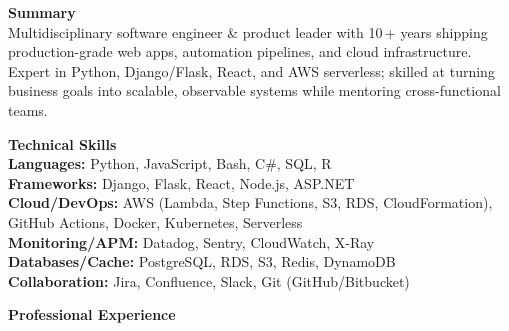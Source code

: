 \documentclass[10pt]{article}
\begin{document}
\RaggedRight

\noindent\textbf{\large Summary}\\
Multidisciplinary software engineer \& product leader with 10\,+ years shipping production-grade web apps, automation pipelines, and cloud infrastructure. Expert in Python, Django/Flask, React, and AWS serverless; skilled at turning business goals into scalable, observable systems while mentoring cross-functional teams.

{\small
\noindent\textbf{\large Technical Skills}\\
\textbf{Languages:} Python, JavaScript, Bash, C\#, SQL, R\\
\textbf{Frameworks:} Django, Flask, React, Node.js, ASP.NET\\
\textbf{Cloud/DevOps:} AWS (Lambda, Step Functions, S3, RDS, CloudFormation), GitHub Actions, Docker, Kubernetes, Serverless\\
\textbf{Monitoring/APM:} Datadog, Sentry, CloudWatch, X-Ray\\
\textbf{Databases/Cache:} PostgreSQL, RDS, S3, Redis, DynamoDB\\
\textbf{Collaboration:} Jira, Confluence, Slack, Git (GitHub/Bitbucket)
\normalsize}

\noindent\textbf{\large Professional Experience}
\end{document}
